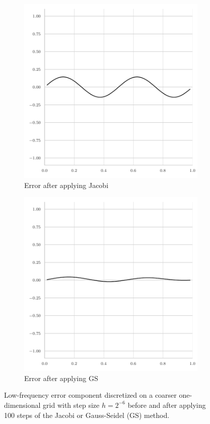\begin{figure}
\begin{subfigure}[t]{0.32\textwidth}
	\includegraphics[width=\textwidth]{figures/error_plots//final_error_jacobi_4pi_coarse.pdf}
	\caption{Error after applying Jacobi}
\end{subfigure}
	\hfill
	\begin{subfigure}[t]{0.32\textwidth}
		\centering
		\includegraphics[width=\textwidth]{figures/error_plots//final_error_gauss_seidel_4pi_coarse.pdf}
		\caption{Error after applying GS}
	\end{subfigure}
	\caption[Low-frequency error component on a coarser one-dimensional grid with step size $h = 2^{-6}$.]{Low-frequency error component discretized on a coarser one-dimensional grid with step size $h = 2^{-6}$ before and after applying 100 steps of the Jacobi or Gauss-Seidel (GS) method.}
	\label{fig:low-frequency-error-component-coarse}
\end{figure}
